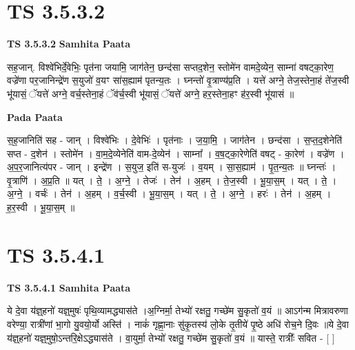 \documentclass[17pt]{extarticle}
\begin{document}
\section*{ TS 3.5.3.2 }

\textbf{TS 3.5.3.2 } \newline
\textbf{Samhita Paata} \newline

सह॒जान्. विश्वे॑भिर्दे॒वेभिः॒ पृत॑ना जयामि॒ जाग॑तेन॒ छन्द॑सा सप्तद॒शेन॒ स्तोमे॑न वामदे॒व्येन॒ साम्ना॑ वषट्का॒रेण॒ वज्रे॑णा पर॒जानिन्द्रे॑ण स॒युजो॑ व॒यꣳ सा॑स॒ह्याम॑ पृतन्य॒तः । घ्नन्तो॑ वृ॒त्राण्य॑प्र॒ति । यत्ते॑ अग्ने॒ तेज॒स्तेना॒हं ते॑ज॒स्वी भू॑यासं॒ ॅयत्ते॑ अग्ने॒ वर्च॒स्तेना॒हं ॅव॑र्च॒स्वी भू॑यासं॒ ॅयत्ते॑ अग्ने॒ हर॒स्तेना॒हꣳ ह॑र॒स्वी भू॑यासं ॥ \newline

\textbf{Pada Paata} \newline

स॒ह॒जानिति॑ सह - जान् । विश्वे॑भिः । दे॒वेभिः॑ । पृत॑नाः । ज॒या॒मि॒ । जाग॑तेन । छन्द॑सा । स॒प्त॒द॒शेनेति॑ सप्त - द॒शेन॑ । स्तोमे॑न । वा॒म॒दे॒व्येनेति॑ वाम-दे॒व्येन॑ । साम्ना᳚ । व॒ष॒ट्का॒रेणेति॑ वषट् - का॒रेण॑ । वज्रे॑ण । अ॒प॒र॒जानित्य॑पर - जान् । इन्द्रे॑ण । स॒युज॒ इति॑ स-युजः॑ । व॒यम् । सा॒स॒ह्याम॑ । पृ॒त॒न्य॒तः ॥ घ्नन्तः॑ । वृ॒त्राणि॑ । अ॒प्र॒ति ॥ यत् । ते॒ । अ॒ग्ने॒ । तेजः॑ । तेन॑ । अ॒हम् । ते॒ज॒स्वी । भू॒या॒स॒म् । यत् । ते॒ । अ॒ग्ने॒ । वर्चः॑ । तेन॑ । अ॒हम् । व॒र्च॒स्वी । भू॒या॒स॒म् । यत् । ते॒ । अ॒ग्ने॒ । हरः॑ । तेन॑ । अ॒हम् । ह॒र॒स्वी । भू॒या॒स॒म् ॥  \newline




\section*{ TS 3.5.4.1 }

\textbf{TS 3.5.4.1 } \newline
\textbf{Samhita Paata} \newline

ये दे॒वा य॑ज्ञ्॒हनो॑ यज्ञ्॒मुषः॑ पृथि॒व्यामद्ध्यास॑ते ।अ॒ग्निर्मा॒ तेभ्यो॑ रक्षतु॒ गच्छे॑म सु॒कृतो॑ व॒यं ॥ आऽग॑न्म मित्रावरुणा वरेण्या॒ रात्री॑णां भा॒गो यु॒वयो॒र्यो अस्ति॑ । नाकं॑ गृह्णा॒नाः सु॑कृ॒तस्य॑ लो॒के तृ॒तीये॑ पृ॒ष्ठे अधि॑ रोच॒ने दि॒वः ॥ये दे॒वा य॑ज्ञ्॒हनो॑ यज्ञ्॒मुषो॒ऽन्तरि॒क्षेऽद्ध्यास॑ते । वा॒युर्मा॒ तेभ्यो॑ रक्षतु॒ गच्छे॑म सु॒कृतो॑ व॒यं ॥ यास्ते॒ रात्रीः᳚ सवित - [  ] \newline
\end{document}
